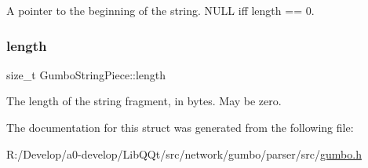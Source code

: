 A pointer to the beginning of the string. N\+U\+LL iff length == 0. \mbox{\label{struct_gumbo_string_piece_a88116bfa980b950bd5615731f61ed09e}} 
\subsubsection{\texorpdfstring{length}{length}}
{\footnotesize\ttfamily size\+\_\+t Gumbo\+String\+Piece\+::length}

The length of the string fragment, in bytes. May be zero. 

The documentation for this struct was generated from the following file\+:\begin{DoxyCompactItemize}
\item 
R\+:/\+Develop/a0-\/develop/\+Lib\+Q\+Qt/src/network/gumbo/parser/src/\mbox{\hyperlink{gumbo_8h}{gumbo.\+h}}\end{DoxyCompactItemize}
